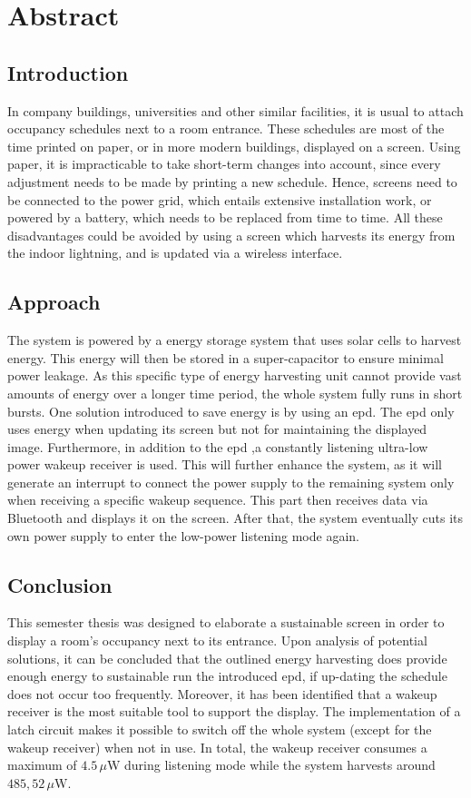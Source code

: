 \chapter*{Abstract}

\section*{Introduction}
In company buildings, universities and other similar facilities, it is usual to attach occupancy schedules next to a room entrance. These schedules are most of the time printed on paper, or in more modern buildings, displayed on a screen. Using paper, it is impracticable to take short-term changes into account, since every adjustment needs to be made by printing a new schedule. Hence, screens need to be connected to the power grid, which entails extensive installation work, or powered by a battery, which needs to be replaced from time to time. All these disadvantages could be avoided by using a screen which harvests its energy from the indoor lightning, and is updated via a wireless interface.

\section*{Approach}
The system is powered by a energy storage system that uses solar cells to harvest energy. This energy will then be stored in a super-capacitor to ensure minimal power leakage. As this specific type of energy harvesting unit cannot provide vast amounts of energy over a longer time period, the whole system fully runs in short bursts. One solution introduced to save energy is by using an \acf{epd}. The \acs{epd} only uses energy when updating its screen but not for maintaining the displayed image. Furthermore, in addition to the \acs{epd} ,a constantly listening ultra-low power wakeup receiver is used. This will further enhance the system, as it will generate an interrupt to connect the power supply to the remaining system only when receiving a specific wakeup sequence. This part then receives data via Bluetooth and displays it on the screen. After that, the system eventually cuts its own power supply to enter the low-power listening mode again.

\section*{Conclusion}
This semester thesis was designed to elaborate a sustainable screen in order to display a room’s occupancy next to its entrance. Upon analysis of potential solutions, it can be concluded that the outlined energy harvesting does provide enough energy to sustainable run the introduced \acf{epd}, if up-dating the schedule does not occur too frequently. Moreover, it has been identified that a wakeup receiver is the most suitable tool to support the display. The implementation of a latch circuit makes it possible to switch off the whole system (except for the wakeup receiver) when not in use. In total, the wakeup receiver consumes a maximum of $4.5\,\mu \text{W}$ during listening mode while the system harvests around $485,52\,\mu\text{W}$. 